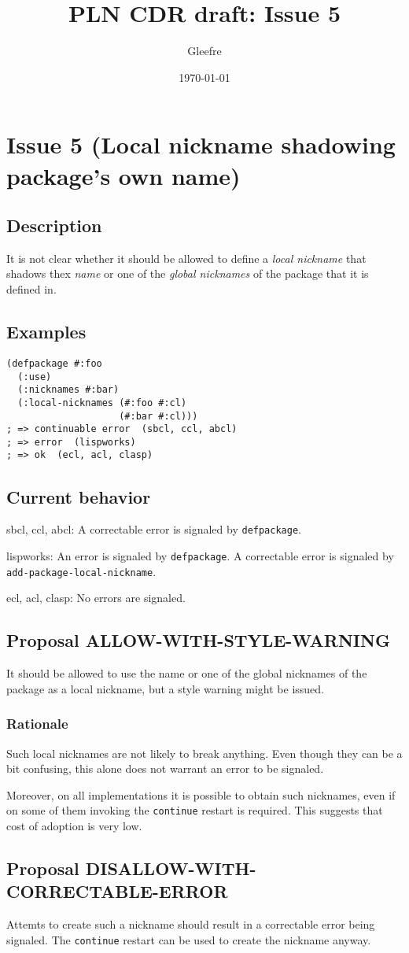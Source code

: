 \documentclass[11pt]{article}
\author{Gleefre}
\date{\today}
\title{PLN CDR draft: Issue 5}
\begin{document}
\maketitle

\section{Issue 5 (Local nickname shadowing package's own name)}
\label{sec:orgc901725}
\subsection{Description}
\label{sec:orgade5ce7}
It is not clear whether it should be allowed to define a \emph{local nickname} that
shadows thex \emph{name} or one of the \emph{global nicknames} of the package that it is
defined in.
\subsection{Examples}
\label{sec:org1c73c4b}
\begin{verbatim}
(defpackage #:foo
  (:use)
  (:nicknames #:bar)
  (:local-nicknames (#:foo #:cl)
                    (#:bar #:cl)))
; => continuable error  (sbcl, ccl, abcl)
; => error  (lispworks)
; => ok  (ecl, acl, clasp)
\end{verbatim}
\subsection{Current behavior}
\label{sec:org2a56698}
sbcl, ccl, abcl:
  A correctable error is signaled by \texttt{defpackage}.

lispworks:
  An error is signaled by \texttt{defpackage}.
  A correctable error is signaled by \texttt{add-package-local-nickname}.

ecl, acl, clasp:
  No errors are signaled.
\subsection{Proposal ALLOW-WITH-STYLE-WARNING}
\label{sec:org84639e9}
It should be allowed to use the name or one of the global nicknames of the package
as a local nickname, but a style warning might be issued.
\subsubsection{Rationale}
\label{sec:org6ae10b0}
Such local nicknames are not likely to break anything. Even though they can be a
bit confusing, this alone does not warrant an error to be signaled.

Moreover, on all implementations it is possible to obtain such nicknames, even if
on some of them invoking the \texttt{continue} restart is required. This suggests that
cost of adoption is very low.
\subsection{Proposal DISALLOW-WITH-CORRECTABLE-ERROR}
\label{sec:org381c681}
Attemts to create such a nickname should result in a correctable error being
signaled. The \texttt{continue} restart can be used to create the nickname anyway.
\end{document}
